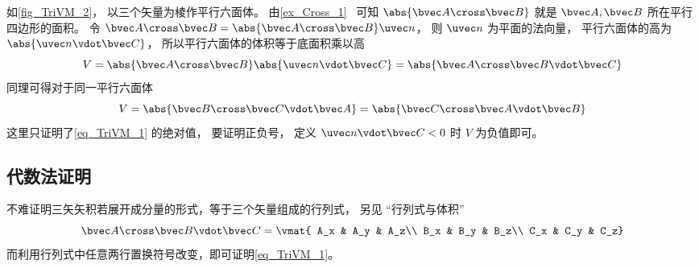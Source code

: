 如\autoref{fig_TriVM_2}， 以三个矢量为棱作平行六面体。 由\autoref{ex_Cross_1}~ 可知 $\abs{\bvec A \cross \bvec B}$ 就是 $\bvec A,\bvec B$ 所在平行四边形的面积。 令 $\bvec A \cross \bvec B = \abs{\bvec A \cross \bvec B} \uvec n$， 则 $\uvec n$ 为平面的法向量， 平行六面体的高为 $\abs{\uvec n \vdot \bvec C}$， 所以平行六面体的体积等于底面积乘以高
\begin{equation}
V = \abs{\bvec A \cross \bvec B} \abs{\uvec n \vdot \bvec C} = \abs{\bvec A \cross \bvec B \vdot \bvec C}
\end{equation}
同理可得对于同一平行六面体
\begin{equation}
V = \abs{\bvec B \cross \bvec C \vdot \bvec A} = \abs{\bvec C \cross \bvec A \vdot \bvec B} 
\end{equation}  
这里只证明了\autoref{eq_TriVM_1} 的绝对值， 要证明正负号， 定义 $\uvec n \vdot \bvec C < 0$ 时 $V$ 为负值即可。

\subsection{代数法证明}
不难证明三矢矢积若展开成分量的形式，等于三个矢量组成的行列式， 另见 “行列式与体积”
\begin{equation}
\bvec A \cross \bvec B \vdot \bvec C = \vmat{
A_x & A_y & A_z\\
B_x & B_y & B_z\\
C_x & C_y & C_z}
\end{equation}
而利用行列式中任意两行置换符号改变，即可证明\autoref{eq_TriVM_1}。
